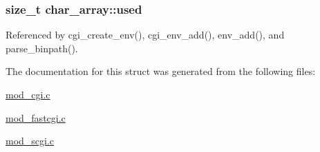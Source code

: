 \hypertarget{structchar__array_a06cada9acbeb475f05a75722ebca4608}{
\subsubsection[{used}]{\setlength{\rightskip}{0pt plus 5cm}size\-\_\-t char\-\_\-array\-::used}}\label{structchar__array_a06cada9acbeb475f05a75722ebca4608}


Referenced by cgi\-\_\-create\-\_\-env(), cgi\-\_\-env\-\_\-add(), env\-\_\-add(), and parse\-\_\-binpath().



The documentation for this struct was generated from the following files\-:\begin{DoxyCompactItemize}
\item 
\hyperlink{mod__cgi_8c}{mod\-\_\-cgi.\-c}\item 
\hyperlink{mod__fastcgi_8c}{mod\-\_\-fastcgi.\-c}\item 
\hyperlink{mod__scgi_8c}{mod\-\_\-scgi.\-c}\end{DoxyCompactItemize}
